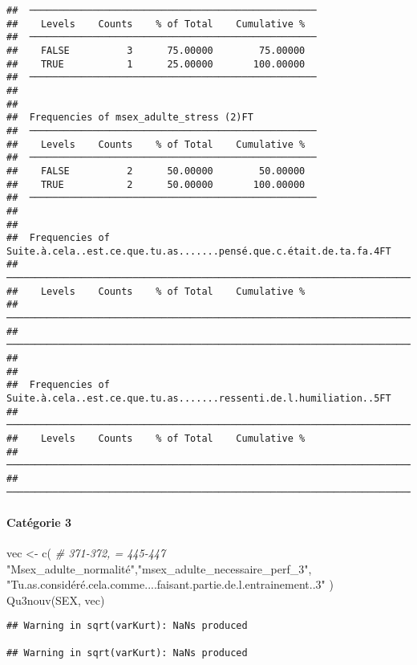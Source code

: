 \documentclass[
]{article}
\newenvironment{Shaded}{\begin{snugshade}}{\end{snugshade}}
\newcommand{\CommentTok}[1]{\textcolor[rgb]{0.56,0.35,0.01}{\textit{#1}}}
\newcommand{\FunctionTok}[1]{\textcolor[rgb]{0.00,0.00,0.00}{#1}}
\newcommand{\NormalTok}[1]{#1}
\newcommand{\OtherTok}[1]{\textcolor[rgb]{0.56,0.35,0.01}{#1}}
\newcommand{\StringTok}[1]{\textcolor[rgb]{0.31,0.60,0.02}{#1}}
\begin{document}
\begin{verbatim}
##  ────────────────────────────────────────────────── 
##    Levels    Counts    % of Total    Cumulative %   
##  ────────────────────────────────────────────────── 
##    FALSE          3      75.00000        75.00000   
##    TRUE           1      25.00000       100.00000   
##  ────────────────────────────────────────────────── 
## 
## 
##  Frequencies of msex_adulte_stress (2)FT            
##  ────────────────────────────────────────────────── 
##    Levels    Counts    % of Total    Cumulative %   
##  ────────────────────────────────────────────────── 
##    FALSE          2      50.00000        50.00000   
##    TRUE           2      50.00000       100.00000   
##  ────────────────────────────────────────────────── 
## 
## 
##  Frequencies of Suite.à.cela..est.ce.que.tu.as.......pensé.que.c.était.de.ta.fa.4FT 
##  ────────────────────────────────────────────────────────────────────────────────── 
##    Levels    Counts    % of Total    Cumulative %   
##  ────────────────────────────────────────────────────────────────────────────────── 
##  ────────────────────────────────────────────────────────────────────────────────── 
## 
## 
##  Frequencies of Suite.à.cela..est.ce.que.tu.as.......ressenti.de.l.humiliation..5FT 
##  ────────────────────────────────────────────────────────────────────────────────── 
##    Levels    Counts    % of Total    Cumulative %   
##  ────────────────────────────────────────────────────────────────────────────────── 
##  ──────────────────────────────────────────────────────────────────────────────────
\end{verbatim}

\hypertarget{catuxe9gorie-3-4}{%
\paragraph{Catégorie 3}\label{catuxe9gorie-3-4}}

\begin{Shaded}
\begin{Highlighting}[]
\NormalTok{vec }\OtherTok{\textless{}{-}} \FunctionTok{c}\NormalTok{(  }\CommentTok{\# 371{-}372, = 445{-}447}
  \StringTok{"Msex\_adulte\_normalité"}\NormalTok{,}\StringTok{"msex\_adulte\_necessaire\_perf\_3"}\NormalTok{,}
  \StringTok{"Tu.as.considéré.cela.comme....faisant.partie.de.l.entrainement..3"}
\NormalTok{)}
\FunctionTok{Qu3nouv}\NormalTok{(SEX, vec)}
\end{Highlighting}
\end{Shaded}

\begin{verbatim}
## Warning in sqrt(varKurt): NaNs produced

## Warning in sqrt(varKurt): NaNs produced
\end{verbatim}
\end{document}
